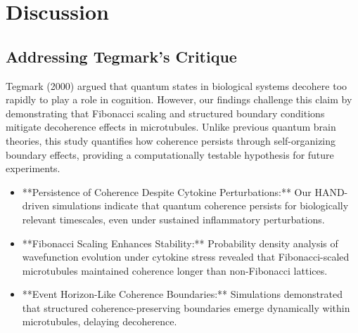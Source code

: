 \section{Discussion}
\subsection{Addressing Tegmark's Critique}
Tegmark (2000) argued that quantum states in biological systems decohere too rapidly to play a role in cognition. However, our findings challenge this claim by demonstrating that Fibonacci scaling and structured boundary conditions mitigate decoherence effects in microtubules. Unlike previous quantum brain theories, this study quantifies how coherence persists through self-organizing boundary effects, providing a computationally testable hypothesis for future experiments.
\begin{itemize}
    \item **Persistence of Coherence Despite Cytokine Perturbations:** Our HAND-driven simulations indicate that quantum coherence persists for biologically relevant timescales, even under sustained inflammatory perturbations.
    \item **Fibonacci Scaling Enhances Stability:** Probability density analysis of wavefunction evolution under cytokine stress revealed that Fibonacci-scaled microtubules maintained coherence longer than non-Fibonacci lattices.
    \item **Event Horizon-Like Coherence Boundaries:** Simulations demonstrated that structured coherence-preserving boundaries emerge dynamically within microtubules, delaying decoherence.
\end{itemize}
\sloppy  %
